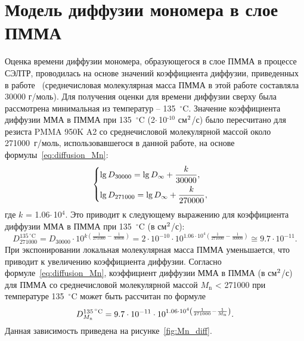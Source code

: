 \section{Модель диффузии мономера в слое ПММА}

Оценка времени диффузии мономера, образующегося в слое ПММА в процессе СЭЛТР, проводилась на основе значений коэффициента диффузии, приведенных в работе~\cite{Karlsson2001_diffusion} (среднечисловая молекулярная масса ПММА в этой работе составляла 30000 г/моль). Для получения оценки для времени диффузии сверху была рассмотрена минимальная из температур -- 135~$^\circ$C.
Значение коэффициента диффузии ММА в ПММА при 135~$^\circ$C (2\:$\cdot$\,10$^\text{-10}$ см$^\text{2}$/с) было пересчитано для резиста PMMA 950K A2 со среднечисловой молекулярной массой около 271000~г/моль, использовавшегося в данной работе, на основе формулы~\ref{eq:diffusion_Mn}:
\begin{equation}
	\begin{cases}
		\lg D_{30000} = \lg D_{\infty} + \displaystyle{\frac{k}{30000}}, \vspace{0.4em} \\
		\lg D_{271000} = \lg D_{\infty} + \displaystyle{\frac{k}{270000}},
	\end{cases}
\end{equation}
где $k$ = 1.06\:$\cdot$\,10$^\text{4}$. Это приводит к следующему выражению для коэффициента диффузии ММА в ПММА при 135~$^\circ$C (в см$^\text{2}$/с):
\begin{equation}
	D_{271000}^{135 \, ^\circ \mathrm{C}} = D_{30000} \cdot 10^{k \left(\frac{1}{271000} - \frac{1}{30000} \right)} = 2 \cdot 10^{-10} \cdot 10^{1.06 \cdot 10^4 \left(\frac{1}{271000} - \frac{1}{30000} \right)} \cong 9.7 \cdot 10^{-11}.
\end{equation}
При экспонировании локальная молекулярная масса ПММА уменьшается, что приводит к увеличению коэффициента диффузии. Согласно формуле~\ref{eq:diffusion_Mn}, коэффициент диффузии ММА в ПММА (в см$^\text{2}$/с) для ПММА со среднечисловой молекулярной массой $M_\mathrm{n}$ < 271000 при температуре 135~$^\circ$C может быть рассчитан по формуле
\begin{equation} \label{eq:D_Mn}
	D_{M_\mathrm{n}}^{135 \, ^\circ \mathrm{C}} = 9.7 \cdot 10^{-11} \cdot 10^{1.06 \cdot 10^4 \left( \frac{1}{271000} - \frac{1}{M_\mathrm{n}} \right)}.
\end{equation}
Данная зависимость приведена на рисунке~\ref{fig:Mn_diff}.

